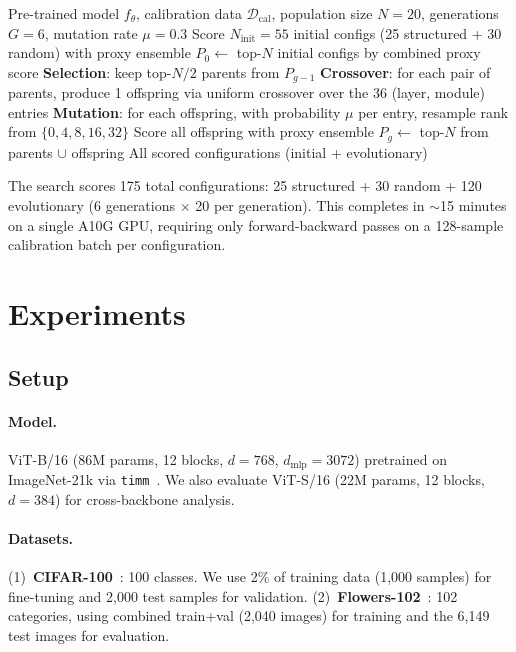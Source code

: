 \documentclass[10pt,twocolumn,letterpaper]{article}
\begin{document}
\begin{algorithm}[t]
\caption{Proxy-guided evolutionary adapter search}
\label{alg:evo}
\small
\begin{algorithmic}[1]
\REQUIRE Pre-trained model $f_\theta$, calibration data $\mathcal{D}_\text{cal}$, population size $N{=}20$, generations $G{=}6$, mutation rate $\mu{=}0.3$
\STATE Score $N_\text{init}{=}55$ initial configs (25 structured + 30 random) with proxy ensemble
\STATE $P_0 \leftarrow$ top-$N$ initial configs by combined proxy score
  \STATE \textbf{Selection}: keep top-$N/2$ parents from $P_{g-1}$
  \STATE \textbf{Crossover}: for each pair of parents, produce 1 offspring via uniform crossover over the 36 (layer, module) entries
  \STATE \textbf{Mutation}: for each offspring, with probability $\mu$ per entry, resample rank from $\{0,4,8,16,32\}$
  \STATE Score all offspring with proxy ensemble
  \STATE $P_g \leftarrow$ top-$N$ from parents $\cup$ offspring
\ENDFOR
\RETURN All scored configurations (initial + evolutionary)
\end{algorithmic}
\end{algorithm}

The search scores 175 total configurations: 25 structured + 30 random + 120 evolutionary (6 generations $\times$ 20 per generation). This completes in $\sim$15 minutes on a single A10G GPU, requiring only forward-backward passes on a 128-sample calibration batch per configuration.

\section{Experiments}
\label{sec:experiments}

\subsection{Setup}

\paragraph{Model.} ViT-B/16 (86M params, 12 blocks, $d{=}768$, $d_\text{mlp}{=}3072$) pretrained on ImageNet-21k via \texttt{timm}~\cite{wightman2019timm}. We also evaluate ViT-S/16 (22M params, 12 blocks, $d{=}384$) for cross-backbone analysis.

\paragraph{Datasets.} (1)~\textbf{CIFAR-100}~\cite{krizhevsky2009cifar}: 100 classes. We use 2\% of training data (1,000 samples) for fine-tuning and 2,000 test samples for validation. (2)~\textbf{Flowers-102}~\cite{nilsback2008flowers}: 102 categories, using combined train+val (2,040 images) for training and the 6,149 test images for evaluation.
\end{document}
